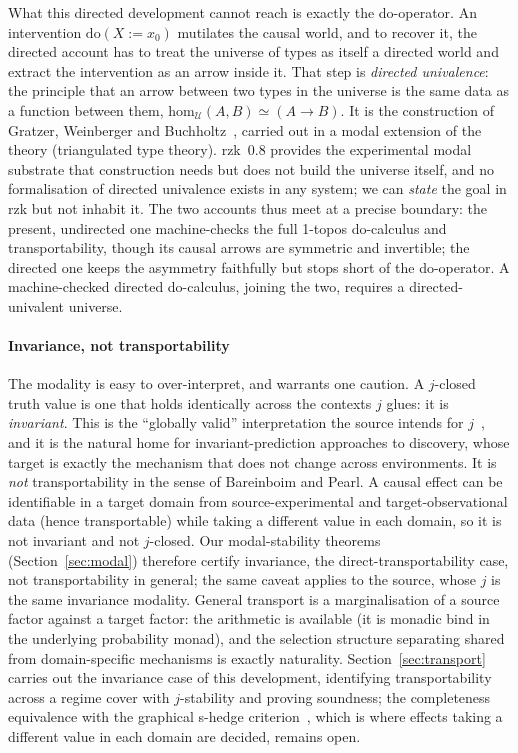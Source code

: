 \documentclass{lmcs}
\newcommand{\dom}[2]{\mathrm{do}(#1\!:=\!#2)}
\begin{document}
What this directed development cannot reach is exactly the do-operator.
An intervention $\dom{X}{x_0}$ mutilates the causal world, and to recover it, the directed account has to treat the universe of types as itself a directed world and extract the intervention as an arrow inside it.
That step is \emph{directed univalence}: the principle that an arrow between two types in the universe is the same data as a function between them, $\mathrm{hom}_{\mathcal{U}}(A,B) \simeq (A \to B)$.
It is the construction of Gratzer, Weinberger and Buchholtz~\cite{gwb-2024}, carried out in a modal extension of the theory (triangulated type theory).
rzk~0.8 provides the experimental modal substrate that construction needs but does not build the universe itself, and no formalisation of directed univalence exists in any system; we can \emph{state} the goal in rzk but not inhabit it.
The two accounts thus meet at a precise boundary: the present, undirected one machine-checks the full 1-topos do-calculus and transportability, though its causal arrows are symmetric and invertible; the directed one keeps the asymmetry faithfully but stops short of the do-operator.
A machine-checked directed do-calculus, joining the two, requires a directed-univalent universe.

\paragraph{Invariance, not transportability}
The modality is easy to over-interpret, and warrants one caution.
A $j$-closed truth value is one that holds identically across the contexts $j$ glues: it is \emph{invariant}.
This is the ``globally valid'' interpretation the source intends for $j$~\cite{mahadevan-2025b}, and it is the natural home for invariant-prediction approaches to discovery, whose target is exactly the mechanism that does not change across environments.
It is \emph{not} transportability in the sense of Bareinboim and Pearl.
A causal effect can be identifiable in a target domain from source-experimental and target-observational data (hence transportable) while taking a different value in each domain, so it is not invariant and not $j$-closed.
Our modal-stability theorems (Section~\ref{sec:modal}) therefore certify invariance, the direct-transportability case, not transportability in general; the same caveat applies to the source, whose $j$ is the same invariance modality.
General transport is a marginalisation of a source factor against a target factor: the arithmetic is available (it is monadic bind in the underlying probability monad), and the selection structure separating shared from domain-specific mechanisms is exactly naturality.
Section~\ref{sec:transport} carries out the invariance case of this development, identifying transportability across a regime cover with $j$-stability and proving soundness; the completeness equivalence with the graphical s-hedge criterion~\cite{bareinboim-pearl-2013}, which is where effects taking a different value in each domain are decided, remains open.
\end{document}
